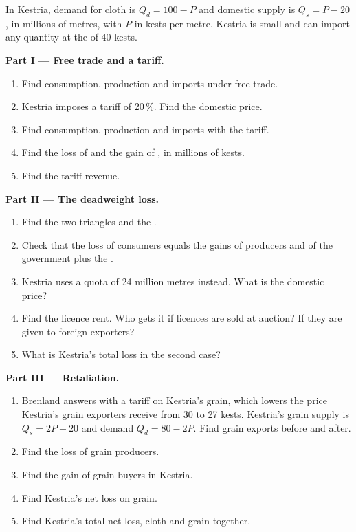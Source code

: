 \begin{problem}
\label{pb:g12:trade-and-trade-policy:1}
In Kestria, demand for cloth is $Q_d = 100 - P$ and domestic supply is $Q_s = P - 20$, in millions of metres, with $P$ in kests per metre. Kestria is small and can import any
quantity at the  of 40 kests.

\medskip
\noindent\textbf{Part I --- Free trade and a tariff.}
\begin{enumerate}
\item Find consumption, production and imports under free trade.
\item Kestria imposes a tariff of 20\,\%. Find the domestic price.
\item Find consumption, production and imports with the tariff.
\item Find the loss of  and the gain of , in millions of kests.
\item Find the tariff revenue.
\end{enumerate}

\medskip
\noindent\textbf{Part II --- The deadweight loss.}
\begin{enumerate}[resume]
\item Find the two triangles and the .
\item Check that the loss of consumers equals the gains of producers and of the government plus the .
\item Kestria uses a quota of 24 million metres instead. What is the domestic price?
\item Find the licence rent. Who gets it if licences are sold at auction? If they are given to foreign exporters?
\item What is Kestria's total loss in the second case?
\end{enumerate}

\medskip
\noindent\textbf{Part III --- Retaliation.}
\begin{enumerate}[resume]
\item Brenland answers with a tariff on Kestria's grain, which lowers the price Kestria's grain exporters receive from 30 to 27 kests. Kestria's grain supply is $Q_s = 2P -
  20$ and demand $Q_d = 80 - 2P$. Find grain exports before and after.
\item Find the loss of grain producers.
\item Find the gain of grain buyers in Kestria.
\item Find Kestria's net loss on grain.
\item Find Kestria's total net loss, cloth and grain together.
\end{enumerate}


\end{problem}
